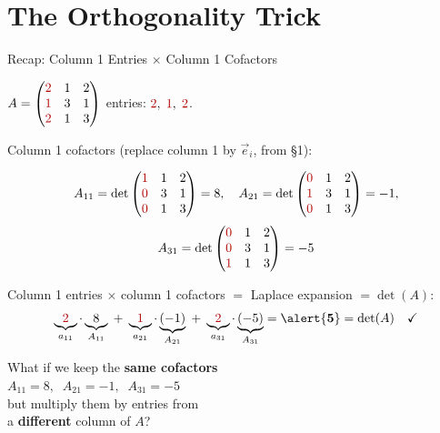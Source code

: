 \documentclass[10pt]{beamer}
\theoremstyle{definition}
\newcommand{\x}[1]{\alert{\textbf{#1}}}
\newcommand{\rd}[1]{{\color{red!70!black}#1}}
\begin{document}
\section{The Orthogonality Trick}


\begin{frame}{Recap: \rd{Column 1} Entries $\times$ \rd{Column 1} Cofactors}

$A = \begin{pmatrix} \rd{2} & 1 & 2 \\ \rd{1} & 3 & 1 \\ \rd{2} & 1 & 3 \end{pmatrix}$
\quad \rd{Column 1} entries: $\rd{2},\; \rd{1},\; \rd{2}$.

\vfill

\rd{Column 1} cofactors (replace \rd{column 1} by $\vec{e}_i$, from \S1):

{\small
$$
A_{11} = \det\begin{pmatrix} \rd{1} & 1 & 2 \\ \rd{0} & 3 & 1 \\ \rd{0} & 1 & 3 \end{pmatrix} = 8,
\quad
A_{21} = \det\begin{pmatrix} \rd{0} & 1 & 2 \\ \rd{1} & 3 & 1 \\ \rd{0} & 1 & 3 \end{pmatrix} = {-}1,
$$
$$
A_{31} = \det\begin{pmatrix} \rd{0} & 1 & 2 \\ \rd{0} & 3 & 1 \\ \rd{1} & 1 & 3 \end{pmatrix} = {-}5
$$
}

\vfill

\rd{Column 1} entries $\times$ \rd{column 1} cofactors $=$ Laplace expansion $= \det(A)$:
$$
\underbrace{\rd{2}}_{a_{11}} \cdot \underbrace{8}_{A_{11}}
\;+\; \underbrace{\rd{1}}_{a_{21}} \cdot \underbrace{({-}1)}_{A_{21}}
\;+\; \underbrace{\rd{2}}_{a_{31}} \cdot \underbrace{({-}5)}_{A_{31}}
= \x{5} = \det(A) \quad \checkmark
$$

\end{frame}


\begin{frame}{}
\vfill
\begin{center}
{\Large What if we keep the \x{same cofactors}\\[6pt]
$A_{11} = 8, \;\; A_{21} = -1, \;\; A_{31} = -5$\\[12pt]
but multiply them by entries from\\[6pt]
a \x{different} column of $A$?}
\end{center}
\vfill
\end{frame}
\end{document}

